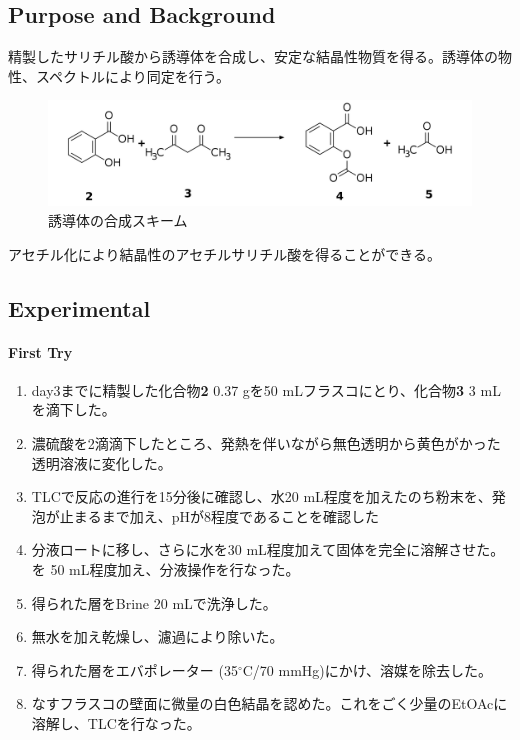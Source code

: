 \documentclass{ltjsarticle}
\theoremstyle{definition}
\numberwithin{equation}{section}
\newcommand{\D}{^\circ\text{C}}
\begin{document}
\subsection{Purpose and Background}
精製したサリチル酸から誘導体を合成し、安定な結晶性物質を得る。誘導体の物性、スペクトルにより同定を行う。
\begin{figure}[htbp]
\begin{center}
\includegraphics[width = 15 cm]{reaction5-1.png}
\caption{誘導体の合成スキーム}
\label{scheme5-1}
\end{center}
\end{figure}

アセチル化により結晶性のアセチルサリチル酸を得ることができる\cite{Zhong}。


\subsection{Experimental}
\paragraph{First Try}
\begin{enumerate}
\item day3までに精製した化合物\textbf{2} 0.37 gを50 mLフラスコにとり、化合物\textbf{3} 3 mLを滴下した。
\item 濃硫酸を2滴滴下したところ、発熱を伴いながら無色透明から黄色がかった透明溶液に変化した。
\item TLCで反応の進行を15分後に確認し、水20 mL程度を加えたのち粉末を、発泡が止まるまで加え、pHが8程度であることを確認した
\item 分液ロートに移し、さらに水を30 mL程度加えて固体を完全に溶解させた。を 50 mL程度加え、分液操作を行なった。
\item 得られた層をBrine 20 mLで洗浄した。
\item 無水を加え乾燥し、濾過により除いた。
\item 得られた層をエバポレーター (35$\D$/70 mmHg)にかけ、溶媒を除去した。
\item なすフラスコの壁面に微量の白色結晶を認めた。これをごく少量のEtOAcに溶解し、TLCを行なった。
\end{enumerate}
\end{document}
